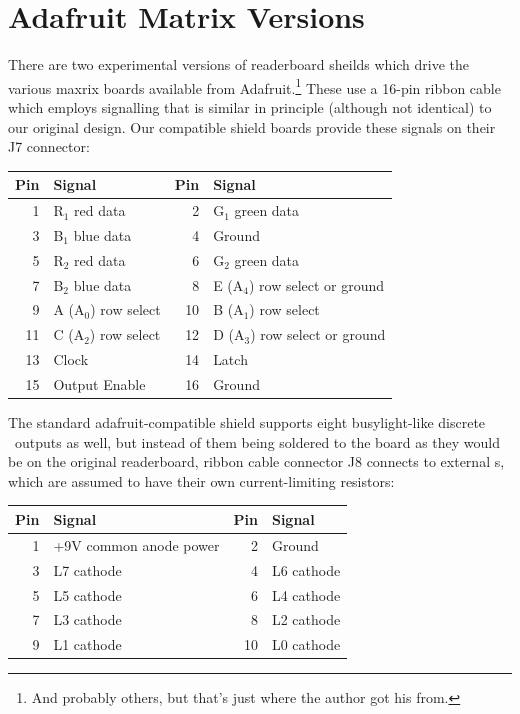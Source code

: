 \section{Adafruit Matrix Versions}
There are two experimental versions of readerboard sheilds which drive the various maxrix boards available from Adafruit.\footnote{And
probably others, but that's just where the author got his from.} These use a 16-pin ribbon cable which employs signalling that is similar
in principle (although not identical) to our original design. Our compatible shield boards provide these signals on their J7 connector:

\begin{center}
	\begin{tabular}{rl|rl}\toprule
		\bfseries Pin&\bfseries Signal &
		\bfseries Pin&\bfseries Signal \\\midrule
		 1&R$_1$ red data      & 2&G$_1$ green data\\
		 3&B$_1$ blue data     & 4&Ground\\
		 5&R$_2$ red data      & 6&G$_2$ green data\\
		 7&B$_2$ blue data     & 8&E (A$_4$) row select or ground\\
		 9&A (A$_0$) row select&10&B (A$_1$) row select\\
		11&C (A$_2$) row select&12&D (A$_3$) row select or ground\\
		13&Clock               &14&Latch \\
		15&Output Enable       &16&Ground \\\bottomrule
	\end{tabular}
\end{center}

The standard adafruit-compatible shield supports eight busylight-like discrete \led\ outputs as well, but instead of them being soldered
to the board as they would be on the original readerboard, ribbon cable connector J8 connects to external \led s, which are assumed to
have their own current-limiting resistors:
\begin{center}
	\begin{tabular}{rl|rl}\toprule
		\bfseries Pin&\bfseries Signal &
		\bfseries Pin&\bfseries Signal \\\midrule
		1&+9V common anode power &2&Ground\\
		3&L7 cathode & 4&L6 cathode\\
		5&L5 cathode & 6&L4 cathode\\
		7&L3 cathode & 8&L2 cathode\\
		9&L1 cathode &10&L0 cathode\\\bottomrule
	\end{tabular}
\end{center}

